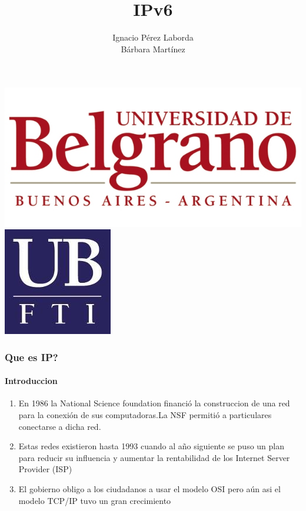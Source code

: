 \documentclass{beamer}
\title[Tecnologia]
{IPv6}
\subtitle{}
\author[Grupo 1] 
{Ignacio P\'erez Laborda\\B\'arbara Mart\'inez}
\institute[UB--FTI] 
{
  Facultad de Tecnolog\'ia Inform\'atica\\
  Universidad de Belgrano
}
\date[\today]
\begin{document}
\begin{frame}

\includegraphics[height=0.2\textheight]{ub2.jpg} \hspace*{6cm}
\includegraphics[height=0.19\textheight]{FTI.jpg}  
\\[-0.1cm]
\titlepage


\end{frame}



\begin{frame}
\frametitle{Que es IP? }
\framesubtitle{Introduccion}
\begin{enumerate}[$*$]
	\item En 1986 la National Science foundation  financió la construccion de una red para la conexión de sus computadoras.La NSF permitió a particulares conectarse a  dicha red.
	\item Estas redes existieron hasta 1993 cuando al año siguiente se puso un plan para reducir su influencia y aumentar la rentabilidad de los Internet Server Provider (ISP)
	\item El gobierno obligo a los ciudadanos a usar el modelo OSI pero aún asi el modelo TCP/IP tuvo un gran crecimiento
		
\end{enumerate}
\end{frame}


\end{document}
